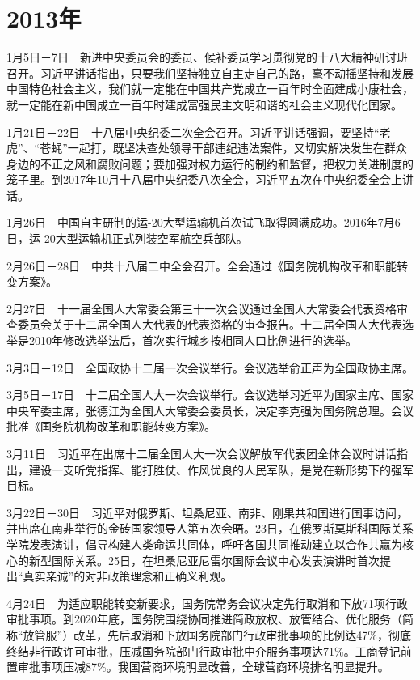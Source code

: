 \documentclass[10pt,a4paper,twocolumn]{book}
\begin{document}
\section{2013年}

1月5日－7日　新进中央委员会的委员、候补委员学习贯彻党的十八大精神研讨班召开。习近平讲话指出，只要我们坚持独立自主走自己的路，毫不动摇坚持和发展中国特色社会主义，我们就一定能在中国共产党成立一百年时全面建成小康社会，就一定能在新中国成立一百年时建成富强民主文明和谐的社会主义现代化国家。

1月21日－22日　十八届中央纪委二次全会召开。习近平讲话强调，要坚持“老虎”、“苍蝇”一起打，既坚决查处领导干部违纪违法案件，又切实解决发生在群众身边的不正之风和腐败问题；要加强对权力运行的制约和监督，把权力关进制度的笼子里。到2017年10月十八届中央纪委八次全会，习近平五次在中央纪委全会上讲话。

1月26日　中国自主研制的运-20大型运输机首次试飞取得圆满成功。2016年7月6日，运-20大型运输机正式列装空军航空兵部队。

2月26日－28日　中共十八届二中全会召开。全会通过《国务院机构改革和职能转变方案》。

2月27日　十一届全国人大常委会第三十一次会议通过全国人大常委会代表资格审查委员会关于十二届全国人大代表的代表资格的审查报告。十二届全国人大代表选举是2010年修改选举法后，首次实行城乡按相同人口比例进行的选举。

3月3日－12日　全国政协十二届一次会议举行。会议选举俞正声为全国政协主席。

3月5日－17日　十二届全国人大一次会议举行。会议选举习近平为国家主席、国家中央军委主席，张德江为全国人大常委会委员长，决定李克强为国务院总理。会议批准《国务院机构改革和职能转变方案》。

3月11日　习近平在出席十二届全国人大一次会议解放军代表团全体会议时讲话指出，建设一支听党指挥、能打胜仗、作风优良的人民军队，是党在新形势下的强军目标。

3月22日－30日　习近平对俄罗斯、坦桑尼亚、南非、刚果共和国进行国事访问，并出席在南非举行的金砖国家领导人第五次会晤。23日，在俄罗斯莫斯科国际关系学院发表演讲，倡导构建人类命运共同体，呼吁各国共同推动建立以合作共赢为核心的新型国际关系。25日，在坦桑尼亚尼雷尔国际会议中心发表演讲时首次提出“真实亲诚”的对非政策理念和正确义利观。

4月24日　为适应职能转变新要求，国务院常务会议决定先行取消和下放71项行政审批事项。到2020年底，国务院围绕协同推进简政放权、放管结合、优化服务（简称“放管服”）改革，先后取消和下放国务院部门行政审批事项的比例达47\%，彻底终结非行政许可审批，压减国务院部门行政审批中介服务事项达71\%。工商登记前置审批事项压减87\%。我国营商环境明显改善，全球营商环境排名明显提升。
\end{document}
